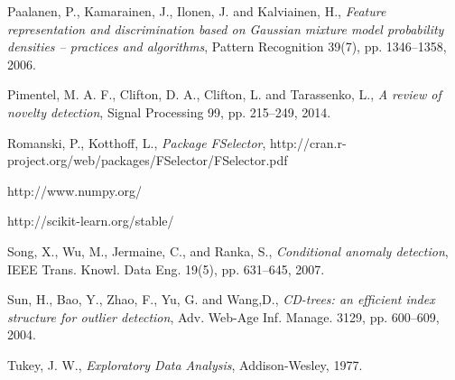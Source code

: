 \documentclass{llncs}
\begin{document}
\begin{thebibliography}{1}
Paalanen, P., Kamarainen, J., Ilonen, J. and Kalviainen, H., \emph{Feature representation
and discrimination based on Gaussian mixture model probability densities – practices and algorithms}, Pattern Recognition 39(7), pp. 1346--1358, 2006.

Pimentel, M. A. F., Clifton, D. A., Clifton, L. and Tarassenko, L., \emph{A review of novelty detection}, Signal Processing 99, pp. 215--249, 2014.

Romanski, P., Kotthoff, L., \emph{Package FSelector}, http://cran.r-project.org/web/packages/FSelector/FSelector.pdf

http://www.numpy.org/

http://scikit-learn.org/stable/

Song, X., Wu, M., Jermaine, C., and Ranka, S., \emph{Conditional anomaly detection}, IEEE Trans. Knowl. Data Eng. 19(5), pp. 631--645, 2007.

Sun, H., Bao, Y., Zhao, F., Yu, G. and Wang,D., \emph{CD-trees: an efficient index structure for outlier detection}, Adv. Web-Age Inf. Manage. 3129, pp. 600--609, 2004.

Tukey, J. W., \emph{Exploratory Data Analysis}, Addison-Wesley, 1977.
\end{thebibliography}
\end{document}
